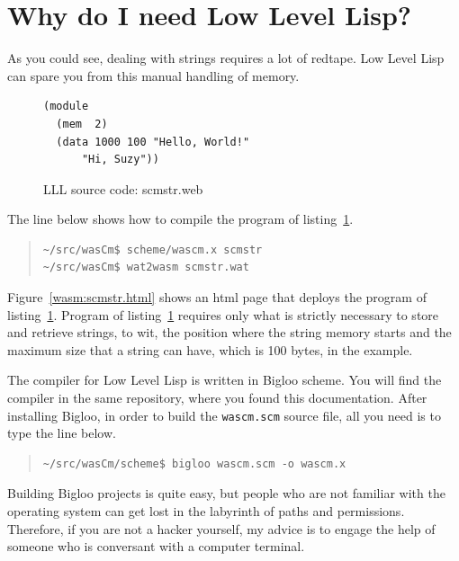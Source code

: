 \documentclass[a4paper,12pt]{book}
\begin{document}
\section{Why do I need Low Level Lisp?}
As you could see, dealing with strings requires
a lot of redtape. Low Level Lisp can spare
you from this manual handling of memory.

\begin{figure}[!h]
\begin{verbatim}
(module
  (mem  2)
  (data 1000 100 "Hello, World!"
      "Hi, Suzy"))
\end{verbatim}
\caption{LLL source code: scmstr.web}
\label{wasm:scmstr.web}  
\end{figure}

The line below shows how to compile the
program of listing~\ref{wasm:scmstr.web}.
\begin{quote}
\begin{verbatim}
~/src/wasCm$ scheme/wascm.x scmstr
~/src/wasCm$ wat2wasm scmstr.wat
\end{verbatim}
\end{quote}

Figure~\ref{wasm:scmstr.html} shows an html page that
deploys the program of listing~\ref{wasm:scmstr.web}.
Program of listing~\ref{wasm:scmstr.web} requires
only what is strictly necessary to store and
retrieve strings, to wit, the position where the
string memory starts and the maximum size that
a string can have, which is 100 bytes, in the example.

The compiler for Low Level Lisp is written in Bigloo
scheme. You will find the compiler in the same repository,
where you found this documentation. After installing
Bigloo, in order to build the \verb|wascm.scm| source
file, all you need is to type the line below.
\begin{quote}
\begin{verbatim}
~/src/wasCm/scheme$ bigloo wascm.scm -o wascm.x
\end{verbatim}
\end{quote}
Building Bigloo projects is quite easy, but people
who are not familiar with the operating system
can get lost in the labyrinth of paths and permissions.
Therefore, if you are not a hacker yourself, my
advice is to engage the help of someone who
is conversant with a computer terminal.
\end{document}
